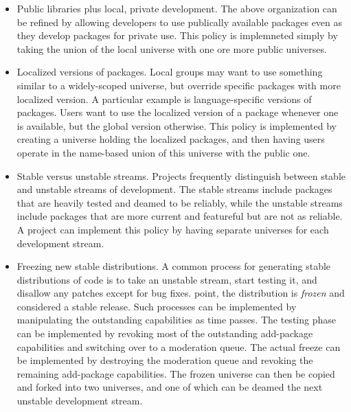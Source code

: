 \documentclass{IEEEtran}
\begin{document}
\begin{itemize}
\item Public libraries plus local, private development.  The above
      organization can be refined by allowing developers to use
      publically available packages even as they develop packages for
      private use.  This policy is implemneted simply by taking the
      union of the local universe with one ore more public universes.


\item Localized versions of packages.  Local groups may want to use
      something similar to a widely-scoped universe, but override
      specific packages with more localized version.  A particular
      example is language-specific versions of packages.  Users want
      to use the localized version of a package whenever one is
      available, but the global version otherwise.  This policy is
      implemented by creating a universe holding the localized packages,
      and then having users operate in the name-based union of this universe
      with the public one.

\item Stable versus unstable streams.  Projects frequently distinguish
      between stable and unstable streams of development.  The stable
      streams include packages that are heavily tested and deamed to
      be reliably, while the unstable streams include packages that
      are more current and featureful but are not as reliable.  A
      project can implement this policy by having separate universes
      for each development stream.  

\item Freezing new stable distributions.  A common process for
      generating stable distributions of code is to take an unstable
      stream, start testing it, and disallow any patches except for
      bug fixes.  %
      point, the distribution is \emph{frozen} and considered a stable
      release.  Such processes can be implemented by manipulating the
      outstanding capabilities as time passes.  The testing phase can
      be implemented by revoking most of the outstanding add-package
      capabilities and switching over to a moderation queue.  The
      actual freeze can be implemented by destroying the moderation
      queue and revoking the remaining add-package capabilities.  The
      frozen universe can then be copied and forked into two
      universes, and one of which can be deamed the next unstable
      development stream.
\end{itemize}
\end{document}

